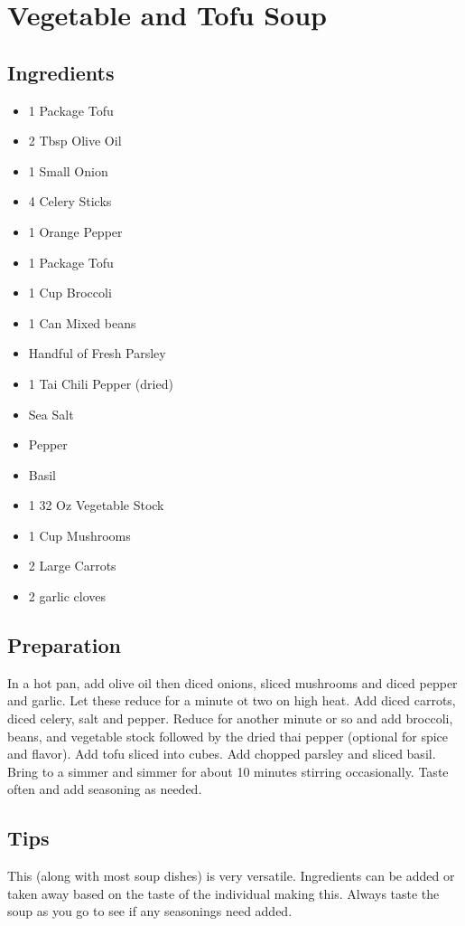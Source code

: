 \thispagestyle{fancy}
\section{Vegetable and Tofu Soup} \label{vegan soup}
\AddToShipoutPicture*{\vegansoup}


\subsection*{Ingredients}

\begin{multicols}{3}
	\begin{itemize}
		\item 1 Package Tofu
		\item 2 Tbsp Olive Oil
		\item 1 Small Onion
		\item 4 Celery Sticks
		\item 1 Orange Pepper
		\item 1 Package Tofu
		\item 1 Cup Broccoli
		\item 1 Can Mixed beans
		\item Handful of Fresh Parsley
		\item 1 Tai Chili Pepper (dried)
		\item Sea Salt
		\item Pepper
		\item Basil
		\item 1 32 Oz Vegetable Stock
		\item 1 Cup Mushrooms
		\item 2 Large Carrots
		\item 2 garlic cloves
	\end{itemize}
\end{multicols}

\subsection*{Preparation}
In a hot pan, add olive oil then diced onions, sliced mushrooms and diced pepper and garlic. Let these reduce for a minute ot two on high heat. Add diced carrots, diced celery, salt and pepper. Reduce for another minute or so and add broccoli, beans, and vegetable stock followed by the dried thai pepper (optional for spice and flavor). Add tofu sliced into cubes. Add chopped parsley and sliced basil. Bring to a simmer and simmer for about 10 minutes stirring occasionally. Taste often and add seasoning as needed.

\subsection*{Tips}

This (along with most soup dishes) is very versatile. Ingredients can be added or taken away based on the taste of the individual making this. Always taste the soup as you go to see if any seasonings need added.
